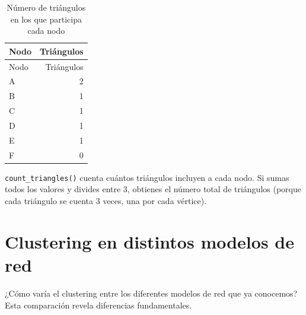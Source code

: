 \documentclass[
  letterpaper,
  DIV=11,
  numbers=noendperiod]{scrreprt}
\begin{document}
\begin{longtable}[]{@{}lr@{}}
\caption{Número de triángulos en los que participa cada
nodo}\tabularnewline
\toprule\noalign{}
Nodo & Triángulos \\
\midrule\noalign{}
\endfirsthead
\toprule\noalign{}
Nodo & Triángulos \\
\midrule\noalign{}
\endhead
\bottomrule\noalign{}
\endlastfoot
A & 2 \\
B & 1 \\
C & 1 \\
D & 1 \\
E & 1 \\
F & 0 \\
\end{longtable}

\begin{tcolorbox}[enhanced jigsaw, toprule=.15mm, colframe=quarto-callout-warning-color-frame, coltitle=black, titlerule=0mm, colback=white, breakable, leftrule=.75mm, arc=.35mm, bottomtitle=1mm, toptitle=1mm, rightrule=.15mm, bottomrule=.15mm, left=2mm, title=\textcolor{quarto-callout-warning-color}{\faExclamationTriangle}\hspace{0.5em}{⚠️ Error frecuente}, colbacktitle=quarto-callout-warning-color!10!white, opacityback=0, opacitybacktitle=0.6]

\texttt{count\_triangles()} cuenta cuántos triángulos incluyen a cada
nodo. Si sumas todos los valores y divides entre 3, obtienes el número
total de triángulos (porque cada triángulo se cuenta 3 veces, una por
cada vértice).

\end{tcolorbox}

\section{Clustering en distintos modelos de
red}\label{clustering-en-distintos-modelos-de-red}

¿Cómo varía el clustering entre los diferentes modelos de red que ya
conocemos? Esta comparación revela diferencias fundamentales.
\end{document}
